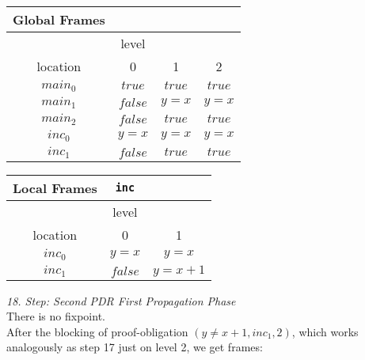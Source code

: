 \documentclass{article}
\begin{document}
\begin{minipage}{.4\textwidth}
	\setlength\tabcolsep{0.35em}
	\begin{center}
		\begin{tabu}{cccc}
			Global Frames \\
			\toprule
			& level \\
			\cmidrule(lr){2-2}
			location & 0 & 1 & 2 \\
			$main_0$ & $true$ & $true$ & $true$  \\
			$main_1$ & $false$ & $y = x$ & $y = x$\\
			$main_2$ & $false$ & $true$ & $true$ \\
			$inc_0$ & $y = x$ & $y = x$ & $y = x$ \\
			$inc_1$ & $false$ & $true$ & $true$\\
			\bottomrule
		\end{tabu}
	\end{center}
\end{minipage}
\hfill
\begin{minipage}{.5\textwidth}
	\setlength\tabcolsep{0.35em}
	\begin{center}
		\begin{tabu}{ccc}
			Local Frames & \texttt{inc}\\
			\toprule
			& level \\
			\cmidrule(lr){2-3}
			location & 0 & 1  \\
			$inc_0$ & $y = x$ & $y = x$  \\
			$inc_1$ & $false$ & $y = x + 1$ \\
			\bottomrule
		\end{tabu}
	\end{center}	
\end{minipage}

\vspace*{1em}
\textsl{18. Step: Second PDR First Propagation Phase} \\
There is no fixpoint. \\
After the blocking of proof-obligation $(y \neq x + 1, inc_1, 2)$, which works analogously as step 17 just on level 2, we get frames: \\
\end{document}
